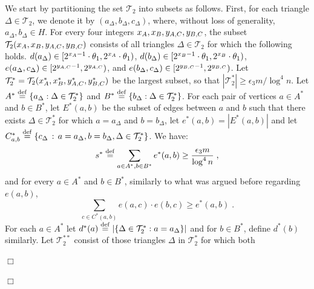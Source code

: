 \documentclass{article}
\newcommand{\eps}{\epsilon}
\newcommand{\eqdef}{\stackrel{\rm def}{=}}
\newcommand{\calT}{{\mathcal{T}}}
\newenvironment{proof}{\smallskip\noindent{\bf Proof:}}%
        {\hspace*{\fill}$\Box$\par}
\newcommand{\commentt}[1]{ {}}
\begin{document}
\begin{proof}
\begin{proof}
We start by partitioning the set $\calT_2$ into subsets as follows. First, for each triangle $\Delta \in \calT_2$, we 
denote it by $(a_\Delta, b_\Delta, c_\Delta)$, where, without loss of generality, $a_\Delta, b_\Delta\in H$. For every four integers $x_{\tiny A},x_{\tiny B},y_{\tiny A,C},y_{\tiny B,C}$,  the subset $\calT_2(x_{\tiny A},x_{\tiny B},y_{\tiny A,C},y_{\tiny B,C})$ consists of all triangles $\Delta \in \calT_2$ for which the following holds.
$d(a_\Delta) \in [2^{x_{\tiny A}-1}\cdot \theta_1 , 2^{x_{\tiny A}}\cdot \theta_1)$, $d(b_\Delta) \in [2^{x_{\tiny B}-1}\cdot \theta_1,  2^{x_{\tiny B}}\cdot \theta_1)$, $e(a_\Delta,c_\Delta) \in [2^{y_{\tiny A,C}-1}, 2^{y_{\tiny A,C}})$, and $e(b_\Delta,c_\Delta) \in [ 2^{y_{\tiny B,C}-1},  2^{y_{\tiny B,C}})$.
Let $\calT^*_2 = \calT_2(x^*_{\tiny A},x^*_{\tiny B},y^*_{\tiny A,C},y^*_{\tiny B,C})$ be the largest subset, so that $|\calT^*_2| \geq \eps_3 m/\log^4 n$. 
Let $A^* \eqdef \{a_\Delta: \Delta \in \calT^*_2\}$ and $B^* \eqdef \{b_\Delta:\Delta \in \calT^*_2\}$. 
For each pair of vertices $a\in A^*$ and $b\in B^*$, let $E^*(a,b)$ be the subset of
edges between $a$ and $b$ such that there exists $\Delta\in \calT^*_2$ for which
$a = a_\Delta$ and $b = b_\Delta$, let $e^*(a,b) = |E^*(a,b)|$
and let $C^*_{a,b} \eqdef \{c_\Delta\,:\, a = a_\Delta, b=b_\Delta, \Delta \in \calT^*_2\}$. 
We have:
\begin{equation}\label{eq:sum-e-star}
s^* \eqdef \sum_{a\in A^*, b\in B^*} e^*(a,b) \geq \frac{\eps_3 m}{\log^4 n}\;,
\end{equation}
and for every $a \in A^*$ and $b\in B^*$, similarly to what was argued before regarding $e(a,b)$,
\begin{equation}\label{eq:e-star-ub}
\sum_{c\in C^*(a,b)} e(a,c)\cdot e(b,c) \geq e^*(a,b)\;.
\end{equation}
\iffalse
For each $a \in A^*$ let $d^*(a) \eqdef |\{\Delta \in \calT^*_2 : a = a_\Delta\}|$ and
for $b \in B^*$, define $d^*(b)$ similarly. \commentt{this is a bit different from the notes -- double-check} 
Let $\calT^{**}_2$ consist of those triangles $\Delta$ in $\calT^*_2$ for which both 

\end{proof}
\end{proof}
\end{document}
